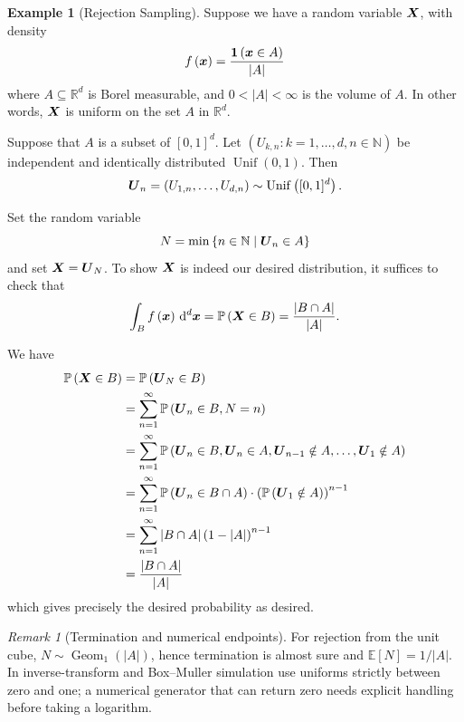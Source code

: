 \documentclass[11pt]{article}
\numberwithin{equation}{section}
\theoremstyle{definition}
\newtheorem{example}[theorem]{Example}
\theoremstyle{remark}
\newtheorem{remark}[theorem]{Remark}
\newcommand{\pqty}[1]{\left(#1\right)}
\newcommand{\abs}[1]{\left|#1\right|}
\newcommand{\set}[2]{\left\{#1\mid #2\right\}}
\newcommand{\ccintv}[2]{[#1,#2]}
\newcommand{\oointv}[2]{(#1,#2)}
\newcommand{\RR}{\mathbb R}
\newcommand{\NN}{\mathbb N}
\newcommand{\indicator}{\mathbf 1}
\newcommand{\Prob}{\mathbb P}
\newcommand{\Expt}{\mathbb E}
\newcommand{\GeomOne}{\operatorname{Geom}_1}
\newcommand{\Uniform}{\operatorname{Unif}}
\begin{document}
\begin{example}[Rejection Sampling]\label{probability-example-048}
    \label{probability-ex:rejection-sampling}%
    Suppose we have a random variable \(\vb{X}\), with density
    \[
        f\pqty{\vb{x}} = \frac{\indicator \pqty{\vb{x} \in A}}{\abs{A}}
    \]
    where \(A \subseteq \RR^d\) is Borel measurable, and \(0<\abs{A} < \infty\) is the volume of \(A\). In other words, \(\vb{X}\) is uniform on the set \(A\) in \(\RR^d\).

    Suppose that \(A\) is a subset of \(\ccintv{0}{1}^d\). Let \(\pqty{U_{k, n} : k = 1, \ldots, d, n \in \NN}\) be independent and identically distributed \(\Uniform \oointv{0}{1}\). Then
    \[
        \vb{U}_n = \pqty{U_{1, n}, \ldots, U_{d, n}} \sim \Uniform\pqty{\ccintv{0}{1}^d}.
    \]

    Set the random variable
    \[
        N = \min \set{n \in \NN}{\vb{U}_n \in A}
    \]
    and set \(\vb{X} = \vb{U}_N\). To show \(\vb{X}\) is indeed our desired distribution, it suffices to check that
    \[
        \int_{B} f\pqty{\vb{x}} \dd[d]{\vb{x}} = \Prob\pqty{\vb{X} \in B} = \frac{\abs{B \cap A}}{\abs{A}}.
    \]

    We have
    \begin{align*}
        \Prob\pqty{\vb{X} \in B} &= \Prob\pqty{\vb{U}_N \in B} \\
        &= \sum_{n = 1}^{\infty} \Prob\pqty{\vb{U}_n \in B, N = n} \\
        &= \sum_{n = 1}^{\infty} \Prob\pqty{\vb{U}_n \in B, \vb{U}_n \in A, \vb{U}_{n - 1} \notin A, \ldots, \vb{U}_1 \notin A} \\
        &= \sum_{n = 1}^{\infty} \Prob\pqty{\vb{U}_n \in B \cap A} \cdot \pqty{\Prob\pqty{\vb{U}_1 \notin A}}^{n - 1} \\
        &= \sum_{n = 1}^{\infty} \abs{B \cap A} \pqty{1 - \abs{A}}^{n - 1} \\
        &= \frac{\abs{B \cap A}}{\abs{A}}
    \end{align*}
    which gives precisely the desired probability as desired.
\end{example}
\begin{remark}[Termination and numerical endpoints]\label{probability-remark-012}
For rejection from the unit cube, \(N\sim\GeomOne(|A|)\), hence termination
is almost sure and \(\Expt[N]=1/|A|\). In inverse-transform and Box--Muller
simulation use uniforms strictly between zero and one; a numerical generator
that can return zero needs explicit handling before taking a logarithm.
\end{remark}
\end{document}
